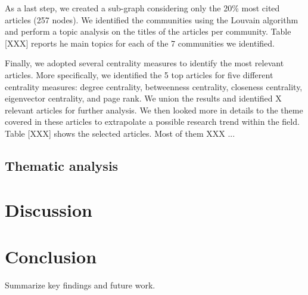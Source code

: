\documentclass[a4paper, review, endfloat, authoryear]{elsarticle}
\begin{document}
	As a last step, we created a sub-graph considering only the 20\% most cited articles (257 nodes). We identified the communities using the Louvain algorithm and perform a topic analysis on the titles of the articles per community. Table [XXX] reports he main topics for each of the 7 communities we identified.
	
	Finally, we adopted several centrality measures to identify the most relevant articles. More specifically, we identified the 5 top articles for five different centrality measures: degree centrality, betweenness centrality, closeness centrality, eigenvector centrality, and page rank. We union the results and identified X relevant articles for further analysis. We then looked more in details to the theme covered in these articles to extrapolate a possible research trend within the field. Table [XXX] shows the selected articles. Most of them XXX ...
	
	
	\subsection{Thematic analysis}
	
	\section{Discussion}
	
	\section{Conclusion}
	Summarize key findings and future work.
	
	
	
	
\end{document}

